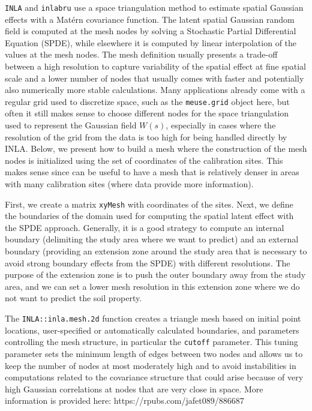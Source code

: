 \documentclass[
  a4paper,
]{article}
\begin{document}
\texttt{INLA} and \texttt{inlabru} use a space triangulation method to
estimate spatial Gaussian effects with a Matérn covariance function. The
latent spatial Gaussian random field is computed at the mesh nodes by
solving a Stochastic Partial Differential Equation (SPDE), while
elsewhere it is computed by linear interpolation of the values at the
mesh nodes. The mesh definition usually presents a trade-off between a
high resolution to capture variability of the spatial effect at fine
spatial scale and a lower number of nodes that usually comes with faster
and potentially also numerically more stable calculations. Many
applications already come with a regular grid used to discretize space,
such as the \texttt{meuse.grid} object here, but often it still makes
sense to choose different nodes for the space triangulation used to
represent the Gaussian field \(W(s)\), especially in cases where the
resolution of the grid from the data is too high for being handled
directly by INLA. Below, we present how to build a mesh where the
construction of the mesh nodes is initialized using the set of
coordinates of the calibration sites. This makes sense since can be
useful to have a mesh that is relatively denser in areas with many
calibration sites (where data provide more information).

First, we create a matrix \texttt{xyMesh} with coordinates of the sites.
Next, we define the boundaries of the domain used for computing the
spatial latent effect with the SPDE approach. Generally, it is a good
strategy to compute an internal boundary (delimiting the study area
where we want to predict) and an external boundary (providing an
extension zone around the study area that is necessary to avoid strong
boundary effects from the SPDE) with different resolutions. The purpose
of the extension zone is to push the outer boundary away from the study
area, and we can set a lower mesh resolution in this extension zone
where we do not want to predict the soil property.

The \texttt{INLA::inla.mesh.2d} function creates a triangle mesh based
on initial point locations, user-specified or automatically calculated
boundaries, and parameters controlling the mesh structure, in particular
the \texttt{cutoff} parameter. This tuning parameter sets the minimum
length of edges between two nodes and allows us to keep the number of
nodes at most moderately high and to avoid instabilities in computations
related to the covariance structure that could arise because of very
high Gaussian correlations at nodes that are very close in space. More
information is provided here: https://rpubs.com/jafet089/886687
\end{document}
